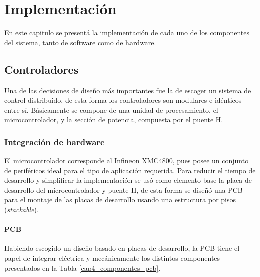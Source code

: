\chapter{Implementación}

En este capitulo se presentá la implementación de cada uno de los componentes del sistema, tanto de software como de hardware.

\section{Controladores}

Una de las decisiones de diseño más importantes fue la de escoger un sistema de control distribuido, de esta forma los controladores son modulares e idénticos entre sí. Básicamente se compone de una unidad de procesamiento, el microcontrolador, y la sección de potencia, compuesta por el puente H.

\subsection{Integración de hardware}

El microcontrolador corresponde al Infineon XMC4800, pues posee un conjunto de periféricos ideal para el tipo de aplicación requerida. Para reducir el tiempo de desarrollo y simplificar la implementación se usó como elemento base la placa de desarrollo del microcontrolador y puente H, de esta forma se diseñó una PCB para el montaje de las placas de desarrollo usando una estructura por pisos (\textit{stackable}).

\subsubsection{PCB}

Habiendo escogido un diseño basado en placas de desarrollo, la PCB tiene el papel de integrar eléctrica y mecánicamente los distintos componentes presentados en la Tabla \ref{cap4_componentes_pcb}.

